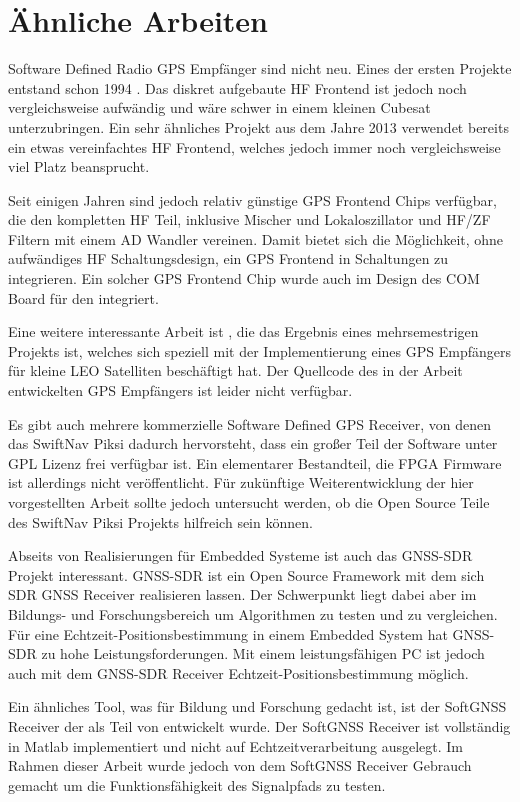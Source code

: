 \section{Ähnliche Arbeiten}
Software Defined Radio GPS Empfänger sind nicht neu. Eines der ersten Projekte entstand schon 1994 \cite{vidmar1994diy}. Das diskret aufgebaute HF Frontend ist jedoch noch vergleichsweise aufwändig und wäre schwer in einem kleinen Cubesat unterzubringen. Ein sehr ähnliches Projekt aus dem Jahre 2013 \cite{A_holme_2013} verwendet bereits ein etwas vereinfachtes HF Frontend, welches jedoch immer noch vergleichsweise viel Platz beansprucht.

Seit einigen Jahren sind jedoch relativ günstige GPS Frontend Chips verfügbar, die den kompletten HF Teil, inklusive Mischer und Lokaloszillator und HF/ZF Filtern mit einem AD Wandler vereinen. Damit bietet sich die Möglichkeit, ohne aufwändiges HF Schaltungsdesign, ein GPS Frontend in Schaltungen zu integrieren. Ein solcher GPS Frontend Chip wurde auch im Design des COM Board für den \dscubesat integriert. 

Eine weitere interessante Arbeit ist \cite{Birklykke2010}, die das Ergebnis eines mehrsemestrigen Projekts ist, welches sich speziell mit der Implementierung eines GPS Empfängers für kleine \gls{LEO} Satelliten beschäftigt hat. Der Quellcode des in der Arbeit entwickelten GPS Empfängers ist leider nicht verfügbar.

Es gibt auch mehrere kommerzielle Software Defined GPS Receiver, von denen das SwiftNav Piksi \cite{SwiftNavPiksi} dadurch hervorsteht, dass ein großer Teil der Software unter GPL Lizenz frei verfügbar ist. Ein elementarer Bestandteil, die FPGA Firmware ist allerdings nicht veröffentlicht. Für zukünftige Weiterentwicklung der hier vorgestellten Arbeit sollte jedoch untersucht werden, ob die Open Source Teile des SwiftNav Piksi Projekts hilfreich sein können.

Abseits von Realisierungen für Embedded Systeme ist auch das GNSS-SDR Projekt \cite{gnss-sdr} interessant. GNSS-SDR ist ein Open Source Framework mit dem sich SDR GNSS Receiver realisieren lassen. Der Schwerpunkt liegt dabei aber im Bildungs- und Forschungsbereich um Algorithmen zu testen und zu vergleichen. Für eine Echtzeit-Positionsbestimmung in einem Embedded System hat GNSS-SDR zu hohe Leistungsforderungen. Mit einem leistungsfähigen PC ist jedoch auch mit dem GNSS-SDR Receiver Echtzeit-Positionsbestimmung möglich.

Ein ähnliches Tool, was für Bildung und Forschung gedacht ist, ist der SoftGNSS Receiver der als Teil von \cite{borre2007software} entwickelt wurde. Der SoftGNSS Receiver ist vollständig in Matlab implementiert und nicht auf Echtzeitverarbeitung ausgelegt. Im Rahmen dieser Arbeit wurde jedoch von dem SoftGNSS Receiver Gebrauch gemacht um die Funktionsfähigkeit des Signalpfads zu testen.